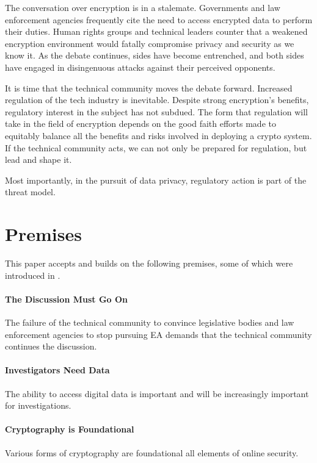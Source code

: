 The conversation over encryption is in a stalemate. Governments and law enforcement agencies frequently cite the need to
access encrypted data to perform their duties. Human rights groups and technical leaders counter that a weakened
encryption environment would fatally compromise privacy and security as we know it. As the debate continues, sides have
become entrenched, and both sides have engaged in disingenuous attacks against their perceived opponents.

It is time that the technical community moves the debate forward. Increased regulation of the tech industry is
inevitable. Despite strong encryption's benefits, regulatory interest in the subject has not subdued. The form that
regulation will take in the field of encryption depends on the good faith efforts made to equitably balance all the
benefits and risks involved in deploying a crypto system. If the technical community acts, we can not only be prepared
for regulation, but lead and shape it.

Most importantly, in the pursuit of data privacy, regulatory action is part of the threat model.

\section{Premises}
\label{sec-premises}

This paper accepts and builds on the following premises, some of which were introduced in .


\paragraph*{The Discussion Must Go On} The failure of the technical community to convince legislative bodies and law
enforcement agencies to stop pursuing \ac{EA} demands that the technical community continues the discussion.

\paragraph*{Investigators Need Data} The ability to access digital data is important and will be increasingly important
for investigations.

\paragraph*{Cryptography is Foundational} Various forms of cryptography are foundational all elements of online
security.

